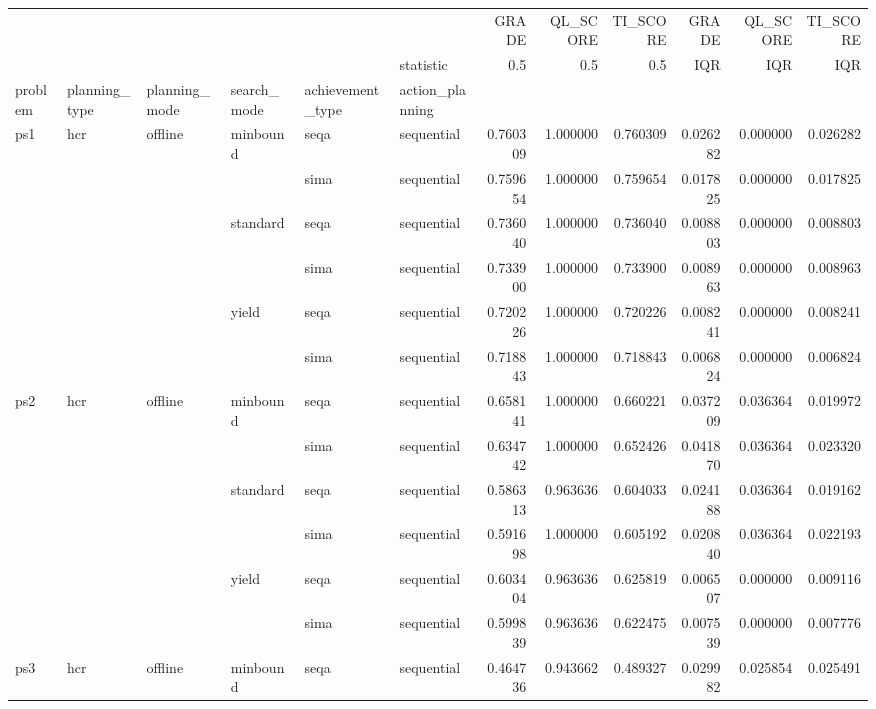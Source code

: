 \begin{tabular}{llllllrrrrrr}
\toprule
    &     &         &       &      & {} &     GRADE &  QL\_SCORE &  TI\_SCORE &     GRADE &  QL\_SCORE &  TI\_SCORE \\
    &     &         &       &      & statistic &       0.5 &       0.5 &       0.5 &       IQR &       IQR &       IQR \\
problem & planning\_type & planning\_mode & search\_mode & achievement\_type & action\_planning &           &           &           &           &           &           \\
\midrule
ps1 & hcr & offline & minbound & seqa & sequential &  0.760309 &  1.000000 &  0.760309 &  0.026282 &  0.000000 &  0.026282 \\
    &     &         &       & sima & sequential &  0.759654 &  1.000000 &  0.759654 &  0.017825 &  0.000000 &  0.017825 \\
    &     &         & standard & seqa & sequential &  0.736040 &  1.000000 &  0.736040 &  0.008803 &  0.000000 &  0.008803 \\
    &     &         &       & sima & sequential &  0.733900 &  1.000000 &  0.733900 &  0.008963 &  0.000000 &  0.008963 \\
    &     &         & yield & seqa & sequential &  0.720226 &  1.000000 &  0.720226 &  0.008241 &  0.000000 &  0.008241 \\
    &     &         &       & sima & sequential &  0.718843 &  1.000000 &  0.718843 &  0.006824 &  0.000000 &  0.006824 \\
ps2 & hcr & offline & minbound & seqa & sequential &  0.658141 &  1.000000 &  0.660221 &  0.037209 &  0.036364 &  0.019972 \\
    &     &         &       & sima & sequential &  0.634742 &  1.000000 &  0.652426 &  0.041870 &  0.036364 &  0.023320 \\
    &     &         & standard & seqa & sequential &  0.586313 &  0.963636 &  0.604033 &  0.024188 &  0.036364 &  0.019162 \\
    &     &         &       & sima & sequential &  0.591698 &  1.000000 &  0.605192 &  0.020840 &  0.036364 &  0.022193 \\
    &     &         & yield & seqa & sequential &  0.603404 &  0.963636 &  0.625819 &  0.006507 &  0.000000 &  0.009116 \\
    &     &         &       & sima & sequential &  0.599839 &  0.963636 &  0.622475 &  0.007539 &  0.000000 &  0.007776 \\
ps3 & hcr & offline & minbound & seqa & sequential &  0.464736 &  0.943662 &  0.489327 &  0.029982 &  0.025854 &  0.025491 \\

\end{tabular}
